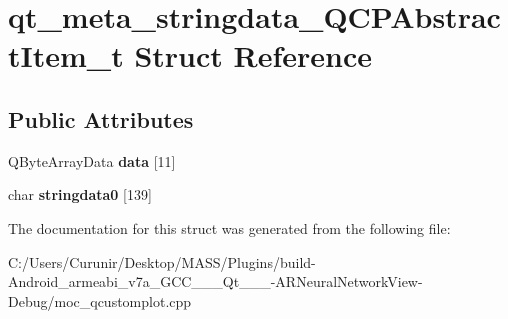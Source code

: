 \hypertarget{structqt__meta__stringdata___q_c_p_abstract_item__t}{}\section{qt\+\_\+meta\+\_\+stringdata\+\_\+\+Q\+C\+P\+Abstract\+Item\+\_\+t Struct Reference}
\label{structqt__meta__stringdata___q_c_p_abstract_item__t}
\subsection*{Public Attributes}
\begin{DoxyCompactItemize}
\item 
\mbox{\label{structqt__meta__stringdata___q_c_p_abstract_item__t_a754a5bd64fcbe2eeb2b9695a52202a7b}} 
Q\+Byte\+Array\+Data {\bfseries data} \mbox{[}11\mbox{]}
\item 
\mbox{\label{structqt__meta__stringdata___q_c_p_abstract_item__t_ad743c59dd46a30c16e862e1c798082ba}} 
char {\bfseries stringdata0} \mbox{[}139\mbox{]}
\end{DoxyCompactItemize}


The documentation for this struct was generated from the following file\+:\begin{DoxyCompactItemize}
\item 
C\+:/\+Users/\+Curunir/\+Desktop/\+M\+A\+S\+S/\+Plugins/build-\/\+Android\+\_\+armeabi\+\_\+v7a\+\_\+\+G\+C\+C\+\_\+\_\+\_\+\+Qt\+\_\+\_\+\_-\/\+A\+R\+Neural\+Network\+View-\/\+Debug/moc\+\_\+qcustomplot.\+cpp\end{DoxyCompactItemize}
